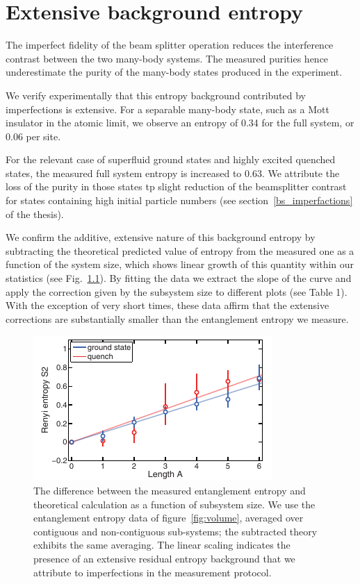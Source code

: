 \chapter{Extensive background entropy}
\label{AppendixC}

The imperfect fidelity of the beam splitter operation reduces the interference contrast between the two many-body systems. The measured purities hence underestimate the purity of the many-body states produced in the experiment. 

We verify experimentally that this entropy background contributed by imperfections is extensive. For a separable many-body state, such as a Mott insulator in the atomic limit, we observe an entropy of 0.34 for the full system, or 0.06 per site. 

For the relevant case of superfluid ground states and highly excited quenched states, the measured full system entropy is increased to 0.63. We attribute the loss of the purity in those states tp slight reduction of the beamsplitter contrast for states containing high initial particle numbers (see section~\ref{bs_imperfactions} of the thesis).

We confirm the additive, extensive nature of this background entropy by subtracting the theoretical predicted value of entropy from the measured one as a function of the system size, which shows linear growth of this quantity within our statistics (see Fig.~\ref{fig:ext}). By fitting the data we extract the slope of the curve and apply the correction given by the subsystem size to different plots (see Table 1). With the exception of very short times, these data affirm that the extensive corrections are substantially smaller than the entanglement entropy we measure.

\begin{figure}
	\centering
	\includegraphics[scale=1.5]{figures/Appendix_extensivity.pdf}
	\caption{The difference between the measured \Renyi entanglement entropy and theoretical calculation as a function of subsystem size. We use the entanglement entropy data of figure~\ref{fig:volume}, averaged over contiguous and non-contiguous sub-systems; the subtracted theory exhibits the same averaging. The linear scaling indicates the presence of an extensive residual entropy background that we attribute to imperfections in the measurement protocol.}
	\label{fig:ext}
	
\end{figure}

